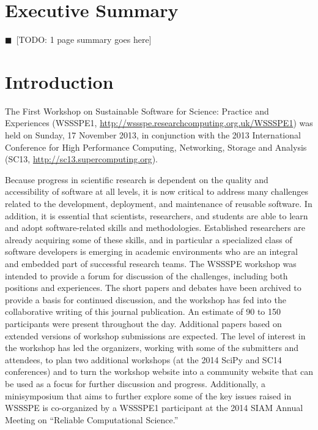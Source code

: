 \documentclass[11pt, oneside]{amsart}
\newcommand{\todo}[1]{{\color{blue}$\blacksquare$~\textsf{[TODO: #1]}}}
\newcommand{\note}[1]{ {\textcolor{red}    { #1 }}}
\begin{document}
\pagebreak

\section*{Executive Summary}

\todo{1 page summary goes here}

\pagebreak

\section{Introduction}

The First Workshop on Sustainable Software for Science: Practice and
Experiences (WSSSPE1,
\url{http://wssspe.researchcomputing.org.uk/WSSSPE1}) was held on
Sunday, 17 November 2013, in conjunction with the 2013 International
Conference for High Performance Computing, Networking, Storage and
Analysis (SC13, \url{http://sc13.supercomputing.org}).

Because progress in scientific research is dependent on the quality and
accessibility of software at all levels, it is now critical to address many
challenges related to the development, deployment, and maintenance of reusable
software.
In addition, it is essential that scientists,
researchers, and students are able to learn and adopt software-related skills
and methodologies. Established researchers are already acquiring some of these
skills, and in particular a specialized class of software developers is
emerging in academic environments who are an integral and embedded part of
successful research teams. The WSSSPE workshop was intended to provide a forum
for discussion of the challenges, including both positions and experiences. The
short papers and debates have been archived to provide a basis for continued
discussion, and the workshop has fed into the collaborative writing of this
journal publication. An estimate of 90 to 150 participants were present 
throughout the day. Additional papers based on extended versions of workshop
submissions are expected. The level of interest in the workshop has led the
organizers, working with some of the submitters and attendees, to plan two
additional workshops (at the 2014 SciPy and SC14 conferences) and to turn the
workshop website into a community website that can be used as a focus for
further discussion and progress. Additionally, a minisymposium that aims to
further explore some of the key issues raised in WSSSPE is co-organized by a
WSSSPE1 participant at the 2014 SIAM Annual Meeting on ``Reliable
Computational Science.''
\end{document}
